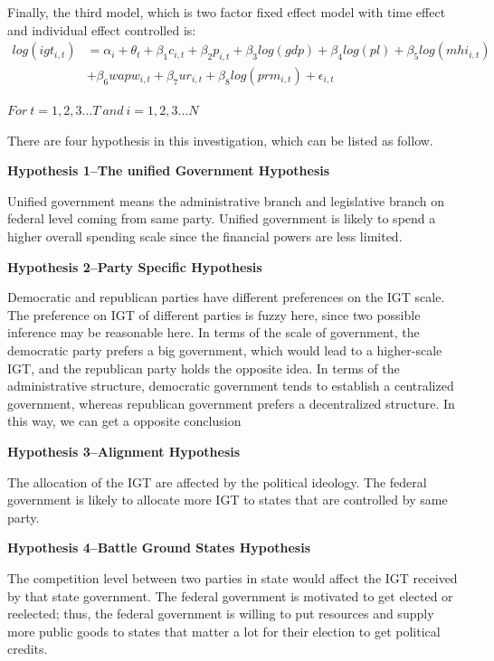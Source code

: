 Finally, the third model, which is two factor fixed effect model with time effect and individual effect controlled is:
\begin{equation}
  \begin{split}
    log(igt_{i,t}) & = \alpha_i + \theta_t + \beta_1 c_{i,t} + \beta_2 p_{i,t} + \beta_3 log(gdp) + \beta_4 log(pl) + \beta_5 log(mhi_{i,t}) \\
    &+ \beta_6 wapw_{i,t} + \beta_7 ur_{i,t} +\beta_8 log(prm_{i,t}) + \epsilon_{i,t}
  \end{split}
\end{equation}

$For\ t = 1, 2, 3...T\ and\ i = 1, 2, 3...N $

There are four hypothesis in this investigation, which can be listed as follow.

\textbf{Hypothesis 1–The unified Government Hypothesis}

Unified government means the administrative branch and legislative branch on federal level coming from same party. Unified government is likely to spend a higher overall spending scale since the financial powers are less limited.

\textbf{Hypothesis 2–Party Specific Hypothesis}

Democratic and republican parties have different preferences on the IGT scale. The preference on IGT of different parties is fuzzy here, since two possible inference may be reasonable here. In terms of the scale of government, the democratic party prefers a big government, which would lead to a higher-scale IGT, and the republican party holds the opposite idea. In terms of the administrative structure, democratic government tends to establish a centralized government, whereas republican government prefers a decentralized structure. In this way, we can get a opposite conclusion

\textbf{Hypothesis 3–Alignment Hypothesis}

The allocation of the IGT are affected by the political ideology. The federal government is likely to allocate more IGT to states that are controlled by same party.

\textbf{Hypothesis 4–Battle Ground States Hypothesis}

The competition level between two parties in state would affect the IGT received by that state government. The federal government is motivated to get elected or reelected; thus, the federal government is willing to put resources and supply more public goods to states that matter a lot for their election to get political credits.

